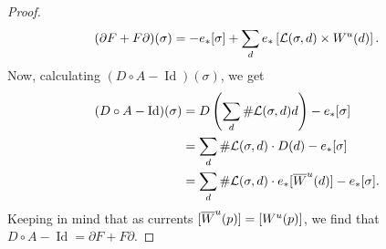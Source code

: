 \begin{proof}
    \[
        (\partial F + F \partial)(\sigma) = -e_* [\sigma] +\sum_{d} e_*\left[\mathcal L(\sigma, d) \times W^u(d)\right].
    \]
    Now, calculating $(D  \circ A - \operatorname{Id})(\sigma)$, we get
    \begin{align*}
        (D  \circ A - \operatorname{Id})(\sigma) &=
        D\left(\sum_d \# \mathcal L(\sigma, d) d\right) - e_*[\sigma]\\
        &= \sum_d \# \mathcal L(\sigma, d) \cdot D(d) - e_*[\sigma]\\
        &= \sum_d \# \mathcal L(\sigma, d) \cdot e_*[\overline{W}^u(d)] - e_*[\sigma]
    .\end{align*} 
    Keeping in mind that as currents $[\overline{W}^u(p)] = [W^u(p)]$, we find that $D  \circ  A - \operatorname{Id} = \partial F + F \partial$.
\end{proof}

